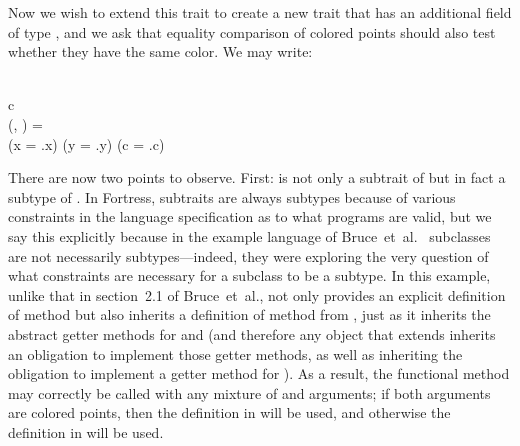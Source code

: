 Now we wish to extend this trait to create a new trait 
that has an additional field  of type , and we ask that equality comparison
of colored points should also test whether they have the same color.
We may write:
\begin{codeexamplesize}
\begin{FortressCode}
    \\
\2\+c\COLON {} \\
  (, \COLON {})\COLON {} = \\
  \2\+(x = .x) \wedge (y = .y) \wedge (c = .c)\-\- \\
\end{FortressCode}
\end{codeexamplesize}
There are now two points to observe.  First:  is not only
a subtrait of  but in fact a subtype of .  In Fortress,
subtraits are always subtypes because of various constraints in the language
specification as to what programs are valid, but we say this explicitly
because in the example language of Bruce~et~al.~\cite{BRUCE-ON-BINARY-METHODS}
subclasses are not necessarily subtypes---indeed, they were exploring the
very question of what constraints are necessary for a subclass to be a subtype.
In this example, unlike that in section~2.1 of Bruce~et~al.,
 not only provides an explicit definition of method 
but also inherits a definition of method  from , just as it inherits
the abstract getter methods for  and  (and therefore any object that
extends  inherits an obligation to implement those getter methods,
as well as inheriting the obligation to implement a getter method for ).
As a result, the functional method  may correctly be called with
any mixture of  and  arguments; if both arguments are
colored points, then the definition in  will be used,
and otherwise the definition in  will be used.

